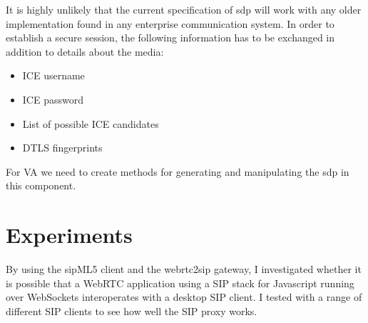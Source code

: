 It is highly unlikely that the current specification of \gls{sdp} will work with any older implementation found in any enterprise communication system. In order to establish a secure session, the following information has to be exchanged in addition to details about the media:

\begin{itemize}
\item{ICE username}
\item{ICE password}
\item{List of possible ICE candidates}
\item{DTLS fingerprint}s
\end{itemize}

For VA we need to create methods for generating and manipulating the \gls{sdp} in this component.

\section{Experiments}
By using the sipML5 client and the webrtc2sip gateway, I investigated whether it is possible that a WebRTC application using a SIP stack for Javascript running over WebSockets interoperates with a desktop SIP client. I tested with a range of different SIP clients to see how well the SIP proxy works.

